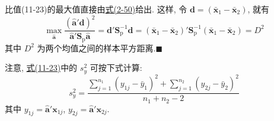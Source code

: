 \noindent{}\quad 比值(11-23)的最大值直接由\hyperref[eq:2-50]{式(2-50)}给出. 这样, 令 $\mathbf{d}=(\bar{\mathbf{x}}_1-\bar{\mathbf{x}}_2)$, 就有
\[
\max_{\hat{\mathbf{a}}}\frac{(\hat{\mathbf{a}}'\mathbf{d})^2}{\hat{\mathbf{a}}'\mathbf{S}_{\mathrm{p}}\hat{\mathbf{a}}}=\mathbf{d}'\mathbf{S}_{\mathrm{p}}^{-1}\mathbf{d}=(\bar{\mathbf{x}}_1-\bar{\mathbf{x}}_2)'\mathbf{S}_{\mathrm{p}}^{-1}(\bar{\mathbf{x}}_1-\bar{\mathbf{x}}_2)=D^2
\]
其中 $D^2$ 为两个均值之间的样本平方距离.\hfill$\blacksquare$

注意, \hyperref[eq:11-23]{式(11-23)}中的 $s_y^2$ 可按下式计算:
\label{eq:11-24}
\begin{equation}
s_y^2=\frac{\sum_{j=1}^{n_1}(y_{1j}-\bar{y}_1)^2+\sum_{j=1}^{n_2}(y_{2j}-\bar{y}_2)^2}{n_1+n_2-2}
\tag{11-24}
\end{equation}
其中 $y_{1j}=\hat{\mathbf{a}}'\mathbf{x}_{1j}$, $y_{2j}=\hat{\mathbf{a}}'\mathbf{x}_{2j}$.
